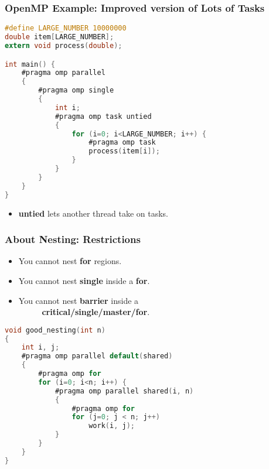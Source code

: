\begin{frame}[fragile]
  \frametitle{OpenMP Example: Improved version of Lots of Tasks}

  
  \begin{lstlisting}[language=C,morekeywords={foreach,pragma,omp,parallel,single,nowait,task,untied,barrier,taskyield,mergeable,final,taskwait,critical}]
#define LARGE_NUMBER 10000000
double item[LARGE_NUMBER];
extern void process(double);

int main() {
    #pragma omp parallel
    {
        #pragma omp single
        {
            int i;
            #pragma omp task untied
            {
                for (i=0; i<LARGE_NUMBER; i++) {
                    #pragma omp task
                    process(item[i]);
                }
            }
        }
    }
}
  \end{lstlisting}
  
  \begin{itemize}
    \item {\bf untied} lets another thread take on tasks.
  \end{itemize}
  
\end{frame}

\begin{frame}[fragile]
  \frametitle{About Nesting: Restrictions}

  
  \begin{itemize}
    \item You cannot nest {\bf for} regions.
    \item You cannot nest {\bf single} inside a {\bf for}.
    \item You cannot nest {\bf barrier} inside a\\~~~~~ {\bf critical/single/master/for}.
  \end{itemize}

  \begin{lstlisting}[language=C,morekeywords={foreach,pragma,omp,parallel,single,nowait,task,untied,barrier,taskyield,mergeable,final,taskwait,critical}]
void good_nesting(int n)
{
    int i, j;
    #pragma omp parallel default(shared)
    {
        #pragma omp for
        for (i=0; i<n; i++) {
            #pragma omp parallel shared(i, n)
            {
                #pragma omp for
                for (j=0; j < n; j++)
                    work(i, j);
            }
        }
    }
}
  \end{lstlisting}
  
\end{frame}

